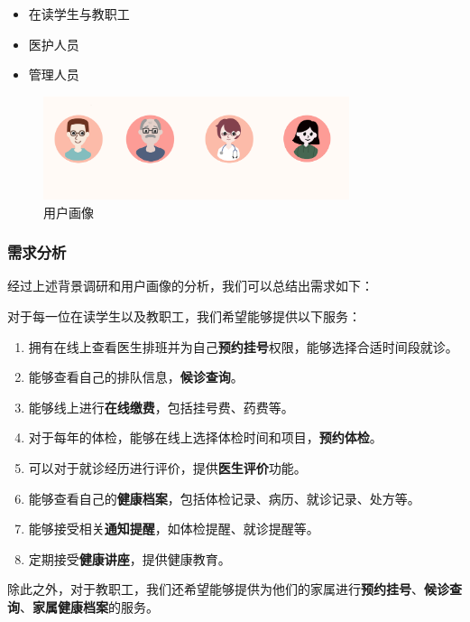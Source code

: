 \documentclass{article}
\begin{document}
\begin{itemize}[itemsep=0.01em]
    \item 在读学生与教职工
    \item 医护人员
    \item 管理人员
\end{itemize}

\begin{figure}[h]
    \centering
    \includegraphics[width=0.8\textwidth]{images/user.jpg}
    \caption{用户画像}
\end{figure}

\subsubsection{需求分析}

经过上述背景调研和用户画像的分析，我们可以总结出需求如下：
\vspace{0.5cm}

对于每一位在读学生以及教职工，我们希望能够提供以下服务：
\begin{enumerate}[itemsep=0.01em]
    \item 拥有在线上查看医生排班并为自己\textbf{预约挂号}权限，能够选择合适时间段就诊。
    \item 能够查看自己的排队信息，\textbf{候诊查询}。
    \item 
    能够线上进行\textbf{在线缴费}，包括挂号费、药费等。
    \item 对于每年的体检，能够在线上选择体检时间和项目，\textbf{预约体检}。
    \item 可以对于就诊经历进行评价，提供\textbf{医生评价}功能。
    \item 能够查看自己的\textbf{健康档案}，包括体检记录、病历、就诊记录、处方等。
    \item 能够接受相关\textbf{通知提醒}，如体检提醒、就诊提醒等。
    \item 定期接受\textbf{健康讲座}，提供健康教育。
\end{enumerate}

除此之外，对于教职工，我们还希望能够提供为他们的家属进行\textbf{预约挂号}、\textbf{候诊查询}、\textbf{家属健康档案}的服务。
\end{document}
